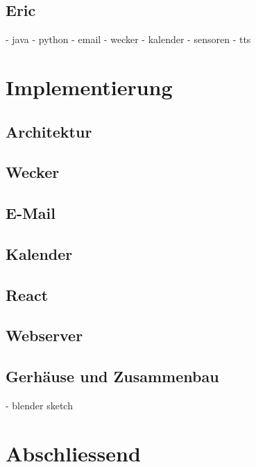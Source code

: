 \documentclass[11pt,a4paper]{article}
\begin{document}
\subsection{Eric}
- java
- python
- email
- wecker
- kalender
- sensoren
- tts

\section{Implementierung}
\subsection{Architektur}

\subsection{Wecker}

\subsection{E-Mail}

\subsection{Kalender}

\subsection{React}

\subsection{Webserver}

\subsection{Gerhäuse und Zusammenbau}
- blender sketch

\section{Abschliessend}



\end{document}
